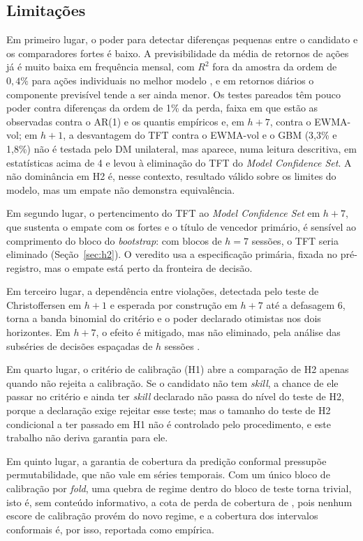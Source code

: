 \subsection{Limitações}
Em primeiro lugar, o poder para detectar diferenças pequenas entre o candidato e os comparadores fortes é baixo. A previsibilidade da média de retornos de ações já é muito baixa em frequência mensal, com \(R^2\) fora da amostra da ordem de \(0{,}4\%\) para ações individuais no melhor modelo \cite{GU2020}, e em retornos diários o componente previsível tende a ser ainda menor. Os testes pareados têm pouco poder contra diferenças da ordem de 1\% da perda, faixa em que estão as observadas contra o AR(1) e os quantis empíricos e, em \(h+7\), contra o EWMA-vol; em \(h+1\), a desvantagem do TFT contra o EWMA-vol e o GBM (3,3\% e 1,8\%) não é testada pelo DM unilateral, mas aparece, numa leitura descritiva, em estatísticas acima de 4 e levou à eliminação do TFT do \textit{Model Confidence Set}. A não dominância em H2 é, nesse contexto, resultado válido sobre os limites do modelo, mas um empate não demonstra equivalência.

Em segundo lugar, o pertencimento do TFT ao \textit{Model Confidence Set} em \(h+7\), que sustenta o empate com os fortes e o título de vencedor primário, é sensível ao comprimento do bloco do \textit{bootstrap}: com blocos de \(h = 7\) sessões, o TFT seria eliminado (Seção~\ref{sec:h2}). O veredito usa a especificação primária, fixada no pré-registro, mas o empate está perto da fronteira de decisão.

Em terceiro lugar, a dependência entre violações, detectada pelo teste de Christoffersen em \(h+1\) e esperada por construção em \(h+7\) até a defasagem 6, torna a banda binomial do critério e o poder declarado otimistas nos dois horizontes. Em \(h+7\), o efeito é mitigado, mas não eliminado, pela análise das subséries de decisões espaçadas de \(h\) sessões \cite{DIEBOLDGUNTHERTAY1998}.

Em quarto lugar, o critério de calibração (H1) abre a comparação de H2 apenas quando não rejeita a calibração. Se o candidato não tem \textit{skill}, a chance de ele passar no critério e ainda ter \textit{skill} declarado não passa do nível do teste de H2, porque a declaração exige rejeitar esse teste; mas o tamanho do teste de H2 condicional a ter passado em H1 não é controlado pelo procedimento, e este trabalho não deriva garantia para ele.

Em quinto lugar, a garantia de cobertura da predição conformal pressupõe permutabilidade, que não vale em séries temporais. Com um único bloco de calibração por \textit{fold}, uma quebra de regime dentro do bloco de teste torna trivial, isto é, sem conteúdo informativo, a cota de perda de cobertura de , pois nenhum escore de calibração provém do novo regime, e a cobertura dos intervalos conformais é, por isso, reportada como empírica.

